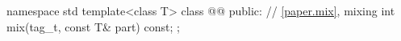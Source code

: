 \begin{codeblock}
namespace std {
  template<class T>
  class @@ {
  public:
    // \ref{paper.mix}, mixing
    int mix(tag_t, const T& part) const;
  };
}
\end{codeblock}
